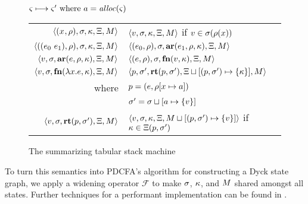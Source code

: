 \documentclass{llncs}
\begin{document}
\begin{figure}
  \centering
  $\varsigma \longmapsto \varsigma' \text{ where } a = \mathit{alloc}(\varsigma)$ \\
  \begin{tabular}{r|l}
    \hline
    $\langle (x^{{}}, \rho), \sigma, \kappa, \Xi, M \rangle$
    &
    $\langle v,\sigma,\kappa, \Xi, M \rangle$ if $v \in \sigma(\rho(x))$
    \\
    $\langle ((e_{0}\ e_{1}){}, \rho), \sigma, \kappa, \Xi, M \rangle$
    &
    $\langle (e_{0}, \rho), \sigma, \mathbf{ar}{}(e_{1},\rho,\kappa), \Xi, M \rangle$
    \\
    $\langle v, \sigma, \mathbf{ar}{}(e,\rho,\kappa), \Xi, M \rangle$
    &
    $\langle (e, \rho), \sigma, \mathbf{fn}{}(v, \kappa), \Xi, M \rangle$
    \\
    $\langle v,\sigma,\mathbf{fn}{}(\lambda{} x. e, \kappa),\Xi,M \rangle$
    & %
    $\langle p,
          \sigma',
          \mathbf{rt}(p, \sigma'),
          \Xi\sqcup[(p, \sigma') \mapsto \{ \kappa \}],
          M \rangle$
    \\ %
    where & $p = (e, \rho[x \mapsto a])$ \\
          & $\sigma' = \sigma\sqcup[a \mapsto \{ v \}]$
    \\
    $\langle v, \sigma, \mathbf{rt}(p,\sigma'), \Xi, M \rangle$
    &
    $\langle v, \sigma, \kappa, \Xi, M\sqcup[(p, \sigma') \mapsto \{ v \}] \rangle$
    if $\kappa \in \Xi(p, \sigma')$
  \end{tabular}
  \caption{The summarizing tabular stack machine}
  \label{fig:summary-semantics}
\end{figure}

To turn this semantics into PDCFA's algorithm for constructing a Dyck
state graph, we apply a widening operator ${\mathcal F}$ to make $\sigma$, $\kappa$,
and $M$ shared amongst all states. Further techniques for a
performant implementation can be found in
\citet{ianjohnson:oaam:2013}.
\end{document}
